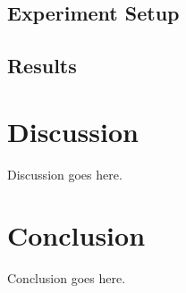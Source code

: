 \documentclass{mldsmsc}
\begin{document}
\section{Experiment Setup}

\section{Results}

\chapter{Discussion}
\label{chap:discussion}

Discussion goes here.

\chapter{Conclusion}


Conclusion goes here. 





\clearpage
\renewcommand*{\thepage}{A\arabic{page}}

%
%




\end{document}
